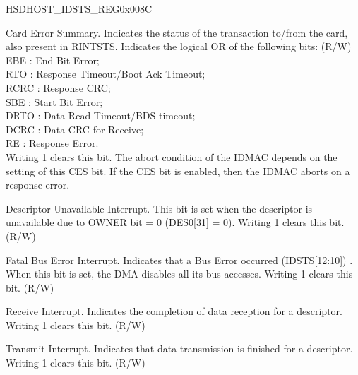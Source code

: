 \addtocounter{Regfloat}{-1}
\begin{register}{H}{SDHOST\_IDSTS\_REG}{0x{}008C}
\begin{regdesc}\begin{reglist}
\item [Continued from the previous page...]
\item [SDHOST\_IDSTS\_CES]Card Error Summary. Indicates the status of the transaction to/from the card, also present in RINTSTS. Indicates the logical OR of the following bits: (R/W)\\
EBE : End Bit Error; \\
RTO : Response Timeout/Boot Ack Timeout; \\
RCRC : Response CRC; \\
SBE : Start Bit Error; \\
DRTO : Data Read Timeout/BDS timeout; \\
DCRC : Data CRC for Receive; \\
RE : Response Error.\\
Writing 1 clears this bit. The abort condition of the IDMAC depends on the setting of this CES bit. If the CES bit is enabled, then the IDMAC aborts on a response error.
\item [SDHOST\_IDSTS\_DU]Descriptor Unavailable Interrupt. This bit is set when the descriptor is unavailable due to OWNER bit = 0 (DES0[31] = 0). Writing 1 clears this bit. (R/W)
\item [SDHOST\_IDSTS\_FBE]Fatal Bus Error Interrupt. Indicates that a Bus Error occurred (IDSTS[12:10]) . When this bit is set, the DMA disables all its bus accesses. Writing 1 clears this bit. (R/W)
\item [SDHOST\_IDSTS\_RI]Receive Interrupt. Indicates the completion of data reception for a descriptor. Writing 1 clears this bit. (R/W)
\item [SDHOST\_IDSTS\_TI]Transmit Interrupt. Indicates that data transmission is finished for a descriptor. Writing 1 clears this bit. (R/W)
\end{reglist}\end{regdesc}
\end{register}


